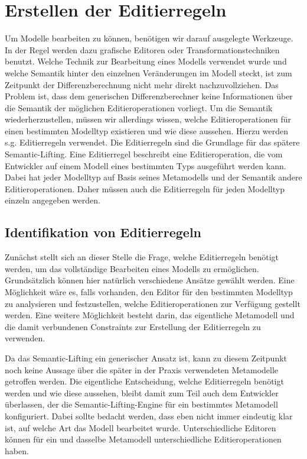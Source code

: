 \chapter{Erstellen der Editierregeln}
\label{editierregeln}

Um Modelle bearbeiten zu können, benötigen wir darauf ausgelegte Werkzeuge. In der Regel werden dazu
grafische Editoren oder Transformationstechniken benutzt. Welche Technik zur Bearbeitung eines
Modells verwendet wurde und welche Semantik hinter den einzelnen Veränderungen im Modell steckt, ist
zum Zeitpunkt der Differenzberechnung nicht mehr direkt nachzuvollziehen. Das Problem ist, dass dem
generischen Differenzberechner keine Informationen über die Semantik der möglichen
Editieroperationen vorliegt. Um die Semantik wiederherzustellen, müssen wir allerdings wissen,
welche Editieroperationen für einen bestimmten Modelltyp existieren und wie diese aussehen. Hierzu
werden s.g. Editierregeln verwendet. Die Editierregeln sind die Grundlage für das spätere Semantic-Lifting.
Eine Editierregel beschreibt eine Editieroperation, die vom Entwickler auf einem Modell eines
bestimmten Typs ausgeführt werden kann. Dabei hat jeder Modelltyp auf Basis seines Metamodells und der
Semantik andere Editieroperationen. Daher müssen auch die Editierregeln für jeden Modelltyp einzeln
angegeben werden.

\section{Identifikation von Editierregeln}

Zunächst stellt sich an dieser Stelle die Frage, welche Editierregeln benötigt werden, um das
vollständige Bearbeiten eines Modells zu ermöglichen. Grundsätzlich können hier natürlich
verschiedene Ansätze gewählt werden. Eine Möglichkeit wäre es, falls vorhanden, den Editor für den
bestimmten Modelltyp zu analysieren und festzustellen, welche Editieroperationen zur Verfügung
gestellt werden. Eine weitere Möglichkeit besteht darin, das eigentliche Metamodell und die damit
verbundenen Constraints zur Erstellung der Editierregeln zu verwenden.

Da das Semantic-Lifting ein generischer Ansatz ist, kann zu diesem Zeitpunkt noch keine Aussage über
die später in der Praxis verwendeten Metamodelle getroffen werden. Die eigentliche Entscheidung,
welche Editierregeln benötigt werden und wie diese aussehen, bleibt damit zum Teil auch dem
Entwickler überlassen, der die Semantic-Lifting-Engine für ein bestimmtes Metamodell
konfiguriert. Dabei sollte bedacht werden, dass eben nicht immer eindeutig klar ist, auf welche Art
das Modell bearbeitet wurde. Unterschiedliche Editoren können für ein und dasselbe Metamodell
unterschiedliche Editieroperationen haben.

